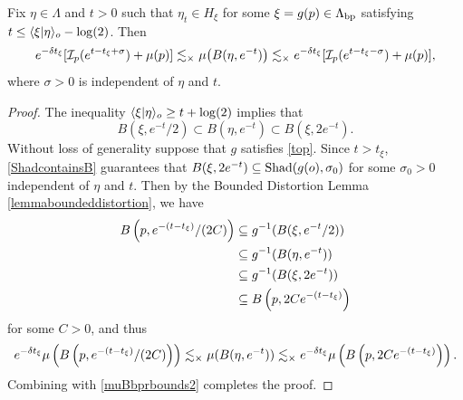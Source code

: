 \begin{corollary}
\label{corollaryglobalmeasure12}
Fix $\eta\in\Lambda$ and $t > 0$ such that $\eta_t\in H_\xi$ for some $\xi = g(p)\in\Lambda_{\mathrm{bp}}$ satisfying $t \leq \langle \xi|\eta\rangle_o - \log(2)$. Then
\[
e^{-\delta t_\xi} [\mathcal I_p(e^{t - t_\xi + \sigma}) + \mu(p)] \lesssim_\times \mu\big(B(\eta,e^{-t})\big) \lesssim_\times e^{-\delta t_\xi} [\mathcal I_p(e^{t - t_\xi - \sigma}) + \mu(p)],
\]
where $\sigma > 0$ is independent of $\eta$ and $t$.
\end{corollary}
\begin{proof}
The inequality $\langle \xi|\eta\rangle_o \geq t + \log(2)$ implies that
\[
B(\xi,e^{-t}/2) \subset B(\eta,e^{-t}) \subset B(\xi,2e^{-t}).
\]
Without loss of generality suppose that $g$ satisfies \eqref{top}. Since $t > t_\xi$, \eqref{ShadcontainsB} guarantees that $B(\xi,2e^{-t}) \subseteq \operatorname{Shad}(g(o),\sigma_0)$ for some $\sigma_0 > 0$ independent of $\eta$ and $t$. Then by the Bounded Distortion Lemma \ref{lemmaboundeddistortion}, we have
\begin{align*}
B\left(p, e^{-(t - t_\xi)}/(2C)\right) &\subseteq g^{-1}(B(\xi,e^{-t}/2))\\ 
&\subseteq g^{-1}(B(\eta,e^{-t}))\\
&\subseteq g^{-1}(B(\xi,2e^{-t}))\\
&\subseteq B\left(p,2C e^{-(t - t_\xi)}\right)
\end{align*}
for some $C > 0$, and thus
\[
e^{-\delta t_\xi} \mu\left(B\left(p, e^{-(t - t_\xi)}/(2C)\right)\right) \lesssim_\times  \mu(B(\eta,e^{-t})) \lesssim_\times e^{-\delta t_\xi} \mu\left(B\left(p,2C e^{-(t - t_\xi)}\right)\right).
\]
Combining with \eqref{muBbprbounds2} completes the proof.
\end{proof}

